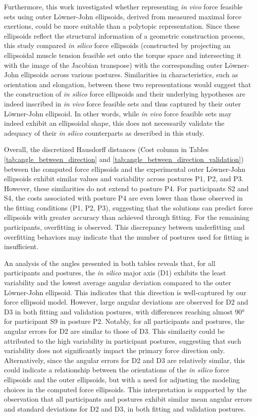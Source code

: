 Furthermore, this work investigated whether representing \emph{in vivo} force feasible sets using outer Löwner-John ellipsoids, derived from measured maximal force exertions, could be more suitable than a polytopic representation. Since these ellipsoids reflect the structural information of a geometric construction process, this study compared \emph{in silico} force ellipsoids (constructed by projecting an ellipsoidal muscle tension feasible set onto the torque space and intersecting it with the image of the Jacobian transpose) with the corresponding outer Löwner-John ellipsoids across various postures. Similarities in characteristics, such as orientation and elongation, between these two representations would suggest that the construction of \emph{in silico} force ellipsoids and their underlying hypotheses are indeed inscribed in \emph{in vivo} force feasible sets and thus captured by their outer Löwner-John ellipsoid. In other words, while \emph{in vivo} force feasible sets may indeed exhibit an ellipsoidal shape, this does not necessarily validate the adequacy of their \emph{in silico} counterparts as described in this study.

Overall, the discretized Hausdorff distances (Cost column in Tables \ref{tab:angle_between_direction} and \ref{tab:angle_between_direction_validation}) between the computed force ellipsoids and the experimental outer Löwner-John ellipsoids exhibit similar values and variability across postures P1, P2, and P3. However, these similarities do not extend to posture P4. For participants S2 and S4, the costs associated with posture P4 are even lower than those observed in the fitting conditions (P1, P2, P3), suggesting that the solutions can predict force ellipsoids with greater accuracy than achieved through fitting. For the remaining participants, overfitting is observed. This discrepancy between underfitting and overfitting behaviors may indicate that the number of postures used for fitting is insufficient.

An analysis of the angles presented in both tables reveals that, for all participants and postures, the \emph{in silico} major axis (D1) exhibits the least variability and the lowest average angular deviation compared to the outer Löwner-John ellipsoid. This indicates that this direction is well-captured by our force ellipsoid model. However, large angular deviations are observed for D2 and D3 in both fitting and validation postures, with differences reaching almost 90° for participant S9 in posture P2. Notably, for all participants and postures, the angular errors for D2 are similar to those of D3. This similarity could be attributed to the high variability in participant postures, suggesting that such variability does not significantly impact the primary force direction only. Alternatively, since the angular errors for D2 and D3 are relatively similar, this could indicate a relationship between the orientations of the \emph{in silico} force ellipsoids and the outer ellipsoids, but with a need for adjusting the modeling choices in the computed force ellipsoids. This interpretation is supported by the observation that all participants and postures exhibit similar mean angular errors and standard deviations for D2 and D3, in both fitting and validation postures.

